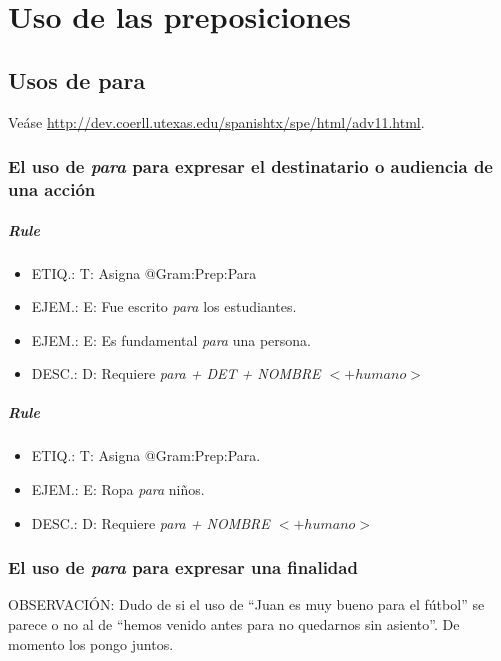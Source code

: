 \documentclass[11pt]{report}
\begin{document}
\chapter{Uso de las preposiciones}
\section{Usos de para}
Veáse \url{http://dev.coerll.utexas.edu/spanishtx/spe/html/adv11.html}.

\subsection{El uso de \emph{para} para expresar el destinatario o audiencia de una acción}
\paragraph*{Rule}
\begin{itemize}
\item ETIQ.:  T: Asigna @Gram:Prep:Para
\item EJEM.:  E: Fue escrito \emph{para} los estudiantes.
\item EJEM.:  E: Es fundamental \emph{para} una persona.
\item DESC.:  D: Requiere \emph{para + DET + NOMBRE $<+humano>$}
\end{itemize}

\paragraph*{Rule}
\begin{itemize}
\item ETIQ.:  T: Asigna @Gram:Prep:Para.
\item EJEM.:  E: Ropa \emph{para} niños.
\item DESC.:  D: Requiere \emph{para + NOMBRE $<+humano>$}
\end{itemize}

\subsection{El uso de \emph{para} para expresar una finalidad}
OBSERVACIÓN: Dudo de si el uso de ``Juan es muy bueno para el fútbol'' se parece o no al de ``hemos venido antes para no quedarnos sin asiento''. De momento los pongo juntos.
\end{document}
